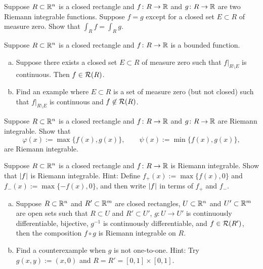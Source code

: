 \begin{exercise}
Suppose $R \subset {\mathbb{R}}^n$ is a closed rectangle and
$f \colon R \to {\mathbb{R}}$ and
$g \colon R \to {\mathbb{R}}$ are two Riemann integrable functions.  Suppose $f = g$
except for a closed set $E \subset R$ of measure zero.  Show that $\int_R f = \int_R g$.
\end{exercise}

\begin{samepage}
\begin{exercise}
Suppose $R \subset {\mathbb{R}}^n$ is a closed rectangle and
$f \colon R \to {\mathbb{R}}$ is a bounded function.
\begin{enumerate}[a)]
\item
Suppose there exists a closed set $E \subset R$ of measure zero such that
$f|_{R\setminus E}$ is continuous.  Then $f \in {\mathcal{R}}(R)$.
\item
Find an example where $E \subset R$ is a set of measure zero (but not
closed) such that
$f|_{R\setminus E}$ is continuous and $f \not\in {\mathcal{R}}(R)$.
\end{enumerate}
\end{exercise}
\end{samepage}

\begin{exercise}
Suppose $R \subset {\mathbb{R}}^n$ is a closed rectangle
and $f \colon R \to {\mathbb{R}}$ and $g \colon R \to {\mathbb{R}}$ 
are Riemann integrable.
Show that
\begin{equation*}
\varphi(x) := \max \{ f(x) , g(x) \} ,
\qquad
\psi(x) := \min \{ f(x) , g(x) \} ,
\end{equation*}
are Riemann integrable.
\end{exercise}

\begin{exercise}
Suppose $R \subset {\mathbb{R}}^n$ is a closed rectangle
and $f \colon R \to {\mathbb{R}}$ is Riemann integrable.
Show that $\lvert {f} \rvert$ is Riemann integrable.
Hint: Define
$f_+(x) := \max \{ f(x) , 0 \}$ and
$f_-(x) := \max \{ -f(x) , 0 \}$, and then write $\lvert {f} \rvert$
in terms of $f_+$ and $f_-$.
\end{exercise}

\begin{exercise}
\leavevmode
\begin{enumerate}[a)]
\item
Suppose $R \subset {\mathbb{R}}^n$ and
$R' \subset {\mathbb{R}}^m$ are closed rectangles,
$U \subset {\mathbb{R}}^n$ and $U' \subset {\mathbb{R}}^m$ are open sets such that
$R \subset U$ and $R' \subset U'$,
$g \colon U \to U'$ is continuously differentiable, bijective,
$g^{-1}$ is continuously differentiable, and
$f \in {\mathcal{R}}(R')$, 
then the composition $f \circ g$ is Riemann integrable on $R$.
\item
Find a counterexample when $g$ is not one-to-one.
Hint: Try $g(x,y) := (x,0)$ and $R=R'=[0,1] \times [0,1]$.
\end{enumerate}
\end{exercise}


